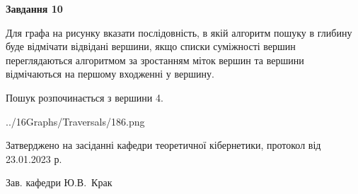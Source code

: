 \documentclass[12pt, ukrainian]{article}
\begin{document}
{\begin {large}
{\begin {center}\textbf{Завдання 10}\end {center}}\par
Для графа на рисунку вказати послідовність, в якій алгоритм пошуку в глибину буде відмічати відвідані вершини, якщо списки суміжності вершин переглядаються алгоритмом за зростанням міток вершин та вершини відмічаються на першому вход\-женні у вершину.\par
Пошук розпочинається з вершини 4.\par

\begin{center}
	{../16Graphs/Traversals/186.png}
\end{center}\par
\newpage


\end {large}
}
{\smallskip \begin {small} Затверджено на засіданні кафедри теоретичної кібернетики, протокол  від   23.01.2023 р.\par\smallskip\smallskip
{\parbox {6.5 cm}{Зав. кафедри \dotfill Ю.В.~Крак}} \end{small}}
\end{document}
